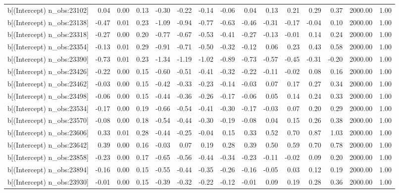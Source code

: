 \begin{table}[ht]
\begin{tabular}{rrrrrrrrrrrrrrr}
  b[(Intercept) n\_obs:23102] & 0.04 & 0.00 & 0.13 & -0.30 & -0.22 & -0.14 & -0.06 & 0.04 & 0.13 & 0.21 & 0.29 & 0.37 & 2000.00 & 1.00 \\ 
  b[(Intercept) n\_obs:23138] & -0.47 & 0.01 & 0.23 & -1.09 & -0.94 & -0.77 & -0.63 & -0.46 & -0.31 & -0.17 & -0.04 & 0.10 & 2000.00 & 1.00 \\ 
  b[(Intercept) n\_obs:23318] & -0.27 & 0.00 & 0.20 & -0.77 & -0.67 & -0.53 & -0.41 & -0.27 & -0.13 & -0.01 & 0.14 & 0.24 & 2000.00 & 1.00 \\ 
  b[(Intercept) n\_obs:23354] & -0.13 & 0.01 & 0.29 & -0.91 & -0.71 & -0.50 & -0.32 & -0.12 & 0.06 & 0.23 & 0.43 & 0.58 & 2000.00 & 1.00 \\ 
  b[(Intercept) n\_obs:23390] & -0.73 & 0.01 & 0.23 & -1.34 & -1.19 & -1.02 & -0.89 & -0.73 & -0.57 & -0.45 & -0.31 & -0.20 & 2000.00 & 1.00 \\ 
  b[(Intercept) n\_obs:23426] & -0.22 & 0.00 & 0.15 & -0.60 & -0.51 & -0.41 & -0.32 & -0.22 & -0.11 & -0.02 & 0.08 & 0.16 & 2000.00 & 1.00 \\ 
  b[(Intercept) n\_obs:23462] & -0.03 & 0.00 & 0.15 & -0.42 & -0.33 & -0.23 & -0.14 & -0.03 & 0.07 & 0.17 & 0.27 & 0.34 & 2000.00 & 1.00 \\ 
  b[(Intercept) n\_obs:23498] & -0.06 & 0.00 & 0.15 & -0.44 & -0.36 & -0.26 & -0.17 & -0.06 & 0.05 & 0.14 & 0.24 & 0.33 & 2000.00 & 1.00 \\ 
  b[(Intercept) n\_obs:23534] & -0.17 & 0.00 & 0.19 & -0.66 & -0.54 & -0.41 & -0.30 & -0.17 & -0.03 & 0.07 & 0.20 & 0.29 & 2000.00 & 1.00 \\ 
  b[(Intercept) n\_obs:23570] & -0.08 & 0.00 & 0.18 & -0.54 & -0.44 & -0.30 & -0.19 & -0.08 & 0.04 & 0.15 & 0.26 & 0.38 & 2000.00 & 1.00 \\ 
  b[(Intercept) n\_obs:23606] & 0.33 & 0.01 & 0.28 & -0.44 & -0.25 & -0.04 & 0.15 & 0.33 & 0.52 & 0.70 & 0.87 & 1.03 & 2000.00 & 1.00 \\ 
  b[(Intercept) n\_obs:23642] & 0.39 & 0.00 & 0.16 & -0.03 & 0.07 & 0.19 & 0.28 & 0.39 & 0.50 & 0.59 & 0.70 & 0.78 & 2000.00 & 1.00 \\ 
  b[(Intercept) n\_obs:23858] & -0.23 & 0.00 & 0.17 & -0.65 & -0.56 & -0.44 & -0.34 & -0.23 & -0.11 & -0.02 & 0.09 & 0.20 & 2000.00 & 1.00 \\ 
  b[(Intercept) n\_obs:23894] & -0.16 & 0.00 & 0.15 & -0.55 & -0.44 & -0.35 & -0.26 & -0.16 & -0.05 & 0.03 & 0.12 & 0.19 & 2000.00 & 1.00 \\ 
  b[(Intercept) n\_obs:23930] & -0.01 & 0.00 & 0.15 & -0.39 & -0.32 & -0.22 & -0.12 & -0.01 & 0.09 & 0.19 & 0.28 & 0.36 & 2000.00 & 1.00 \\ 

\end{tabular}
\end{table}
